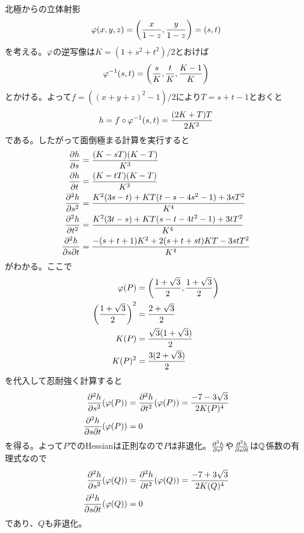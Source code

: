 \begin{sol}
  北極からの立体射影
  \[
  {\varphi}(x,y,z) = \left( \frac{x}{1-z}, \frac{y}{1-z} \right) = (s,t)
  \]
  を考える。${\varphi}$の逆写像は$K = (1 + s^2 + t^2)/2$とおけば
  \[
  {\varphi}^{-1}(s,t) = \left( \frac{s}{K}, \frac{t}{K}, \frac{K-1}{K}  \right)
  \]
  とかける。よって$f= ((x+y+z)^2 -1)/2$により$T = s+t-1$とおくと
  \[
  h = f \circ {\varphi}^{-1}(s,t) = \frac{(2K+T) T}{2K^2}
  \]
  である。したがって面倒極まる計算を実行すると
  \begin{align*}
    \frac{\partial h}{\partial s} &= \frac{(K-sT)(K-T)}{K^3} \\
      \frac{\partial h}{\partial t} &= \frac{(K-tT)(K-T)}{K^3} \\
    \frac{ \partial^2 h}{\partial s^2} &= \frac{ K^2(3s-t) +KT(t-s-4s^2 -1) +3sT^2 }{K^4} \\
  \frac{ \partial^2 h}{\partial t^2} &= \frac{ K^2(3t-s) +KT(s-t-4t^2 -1) +3tT^2 }{K^4} \\
  \frac{ \partial^2 h}{\partial s \partial t} &= \frac{ -(s+t+1)K^2 + 2(s+t+st)KT - 3stT^2 }{ K^4 }
  \end{align*}
  がわかる。ここで
  \begin{align*}
    {\varphi}(P) &= \left( \frac{1+\sqrt{3} }{2},  \frac{1+\sqrt{3} }{2} \right)     \\
\left( \frac{1+\sqrt{3} }{2} \right)^2 &= \frac{ 2 + \sqrt{3} }{2}  \\
K(P ) &= \frac{ \sqrt{3} (1+ \sqrt{3} ) }{2} \\
K(P )^2 &= \frac{ 3 (2+ \sqrt{3} ) }{2}
  \end{align*}
  を代入して忍耐強く計算すると
  \begin{align*}
    \frac{ \partial^2 h}{\partial s^2}({\varphi}(P)) &= \frac{ \partial^2 h}{\partial t^2}({\varphi}(P)) = \frac{ -7-3\sqrt{3} }{2K(P)^4 } \\
    \frac{ \partial^2 h}{\partial s \partial t}({\varphi}(P) ) &= 0
  \end{align*}
  を得る。よって$P$でのHessianは正則なので$P$は非退化。$\frac{ \partial^2 h}{\partial s^2}$や$\frac{ \partial^2 h}{\partial s \partial t}$は${\mathbb Q}$係数の有理式なので
  \begin{align*}
    \frac{ \partial^2 h}{\partial s^2}({\varphi}(Q)) &= \frac{ \partial^2 h}{\partial t^2}({\varphi}(Q)) = \frac{ -7+3\sqrt{3} }{2K(Q)^4 } \\
    \frac{ \partial^2 h}{\partial s \partial t}({\varphi}(Q) ) &= 0
  \end{align*}
  であり、$Q$も非退化。
\end{sol}

\newpage

